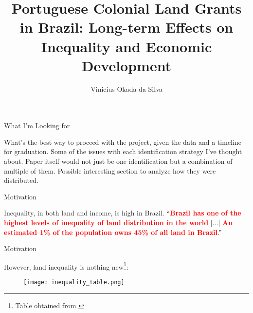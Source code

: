\documentclass[aspectratio=1610, handout]{beamer}
\title{Portuguese Colonial Land Grants in Brazil: Long-term Effects on Inequality and Economic Development}
\author{Vinicius Okada da Silva}
\institute{The University of Illinois at Urbana-Champaign}
\date{}
\begin{document}
\begin{frame}
	\titlepage
\end{frame}

\begin{frame}{What I'm Looking for}
    \begin{outline}
        \1 What's the best way to proceed with the project, given the data and a timeline for graduation.
        \vspace{2mm}
        \1 Some of the issues with each identification strategy I've thought about.
        \vspace{2mm}
            \2 Paper itself would not just be one identification but a combination of multiple of them. 
        \vspace{2mm}
        \1 Possible interesting section to analyze how they were distributed.
    \end{outline}
\end{frame}

\begin{frame}{Motivation}
    \begin{outline}
        \1 Inequality, in both land and income, is high in Brazil.
            \vspace{2mm}
            \2 ``\textcolor{red}{\textbf{Brazil has one of the highest levels of inequality of land distribution in the world}} [...] \textcolor{red}{\textbf{An estimated 1\% of the population owns 45\% of all land in Brazil}}.'' \parencite{Usaid2016-xs}
    \end{outline}
\end{frame}

\begin{frame}{Motivation}
    \begin{outline}
        \1 However, land inequality is nothing new\footnote[frame,1]{Table obtained from \textcite{Alston2010-cn}}:
    \end{outline}

    \begin{figure}
        \centering
        \texttt{[image: inequality\_table.png]}
    \end{figure}
\end{frame}
\end{document}
